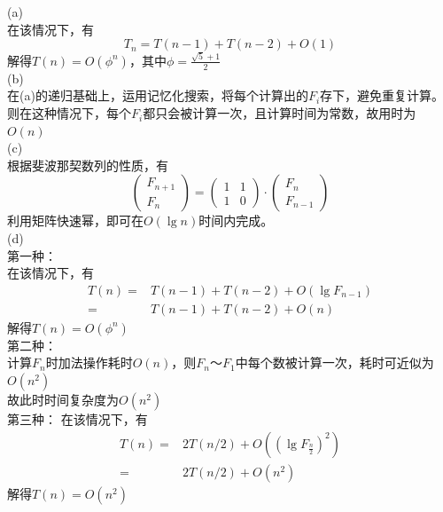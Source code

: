 \documentclass[a4paper, justified]{tufte-handout}
\begin{document}
\begin{solution}
(a)\\
在该情况下，有
\[
T_n =T(n-1)+T(n-2)+O(1)
\]
解得$T(n)=O(\phi^n)$，其中$\phi=\frac{\sqrt{5}+1}{2}$\\
(b)\\
在(a)的递归基础上，运用记忆化搜索，将每个计算出的$F_i$存下，避免重复计算。则在这种情况下，每个$F_i$都只会被计算一次，且计算时间为常数，故用时为$O(n)$\\
(c)\\
根据斐波那契数列的性质，有
 $$\begin{pmatrix}F_{n+1}\\
			   F_{n}
     \end{pmatrix}
     =
     \begin{pmatrix} 
     			     1&1\\
			     1&0
     \end{pmatrix}
     \cdot
     \begin{pmatrix}F_{n}\\
     			   F_{n-1}
     \end{pmatrix}$$
 利用矩阵快速幂，即可在$O(\lg n)$时间内完成。\\
 (d)\\
 第一种：\\
 在该情况下，有
\[
\begin{aligned}
T(n) =&T(n-1)+T(n-2)+O(\lg F_{n-1})\\
=&T(n-1)+T(n-2)+O(n)
\end{aligned}
\]
解得$T(n)=O(\phi^n)$\\

\noindent 第二种：\\
计算$F_{n}$时加法操作耗时$O(n)$，则$F_n$～$F_1$中每个数被计算一次，耗时可近似为$O(n^2)$\\
故此时时间复杂度为$O(n^2)$\\

\noindent 第三种：
在该情况下，有
\[
\begin{aligned}
T(n) =&2T(n/2)+O((\lg F_{\frac{n}{2}})^2)\\
=&2T(n/2)+O(n^2)
\end{aligned}
\]
解得$T(n)=O(n^2)$\\
\end{solution}

\beginoptional

\begin{problem}[TC Problem 31-4]
\end{problem}
\end{document}
